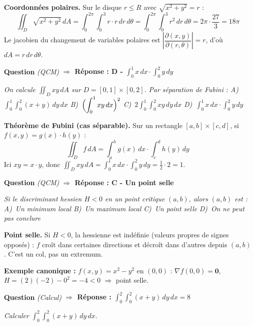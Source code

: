 \documentclass[11pt,a4paper]{article}
\newcounter{qnum}
\newcommand{\qtitre}[2]{%
  \stepcounter{qnum}%
  \medskip\noindent
  \textbf{\color{bleutexte}Question \theqnum}\enspace
  \textit{(#1)}\enspace
  \textcolor{vertok}{\textbf{$\Rightarrow$ Réponse : #2}}
  \par\smallskip
}
\newcommand{\qenonce}[1]{%
  \begin{mdframed}[backgroundcolor=grisbox, linewidth=0pt,
    innerleftmargin=8pt, innerrightmargin=8pt,
    innertopmargin=5pt, innerbottommargin=5pt,
    skipabove=2pt, skipbelow=4pt]
  \small\textit{#1}
  \end{mdframed}
}
\begin{document}
\begin{methodebox}
\textbf{Coordonnées polaires.} Sur le disque $r \leq R$ avec $\sqrt{x^2+y^2} = r$ :
$$\iint_D \sqrt{x^2+y^2}\,dA = \int_0^{2\pi}\!\int_0^3 r \cdot r\,dr\,d\theta = \int_0^{2\pi}\!\int_0^3 r^2\,dr\,d\theta = 2\pi\cdot\frac{27}{3} = 18\pi$$
Le jacobien du changement de variables polaires est $\left|\dfrac{\partial(x,y)}{\partial(r,\theta)}\right| = r$, d'où $dA = r\,dr\,d\theta$.
\end{methodebox}

\qtitre{QCM}{D - $\displaystyle\int_0^1 x\,dx \cdot \int_0^2 y\,dy$}
\qenonce{On calcule $\displaystyle\iint_D xy\,dA$ sur $D=[0,1]\times[0,2]$. Par séparation de Fubini :
\quad A)~$\displaystyle\int_0^1\!\int_0^2 (x+y)\,dy\,dx$
\quad B)~$\displaystyle\Bigl(\int_0^1 xy\,dx\Bigr)^2$
\quad C)~$\displaystyle 2\int_0^1\!\int_0^2 xy\,dy\,dx$
\quad D)~$\displaystyle\int_0^1 x\,dx \cdot \int_0^2 y\,dy$}

\begin{methodebox}
\textbf{Théorème de Fubini (cas séparable).} Sur un rectangle $[a,b]\times[c,d]$, si $f(x,y) = g(x)\cdot h(y)$ :
$$\iint_D f\,dA = \int_a^b g(x)\,dx \cdot \int_c^d h(y)\,dy$$
Ici $xy = x \cdot y$, donc $\displaystyle\iint_D xy\,dA = \int_0^1 x\,dx \cdot \int_0^2 y\,dy = \frac{1}{2}\cdot 2 = 1$.
\end{methodebox}

\qtitre{QCM}{C - Un point selle}
\qenonce{Si le discriminant hessien $H < 0$ en un point critique $(a,b)$, alors $(a,b)$ est :
\quad A)~Un minimum local
\quad B)~Un maximum local
\quad C)~Un point selle
\quad D)~On ne peut pas conclure}

\begin{methodebox}
\textbf{Point selle.} Si $H < 0$, la hessienne est indéfinie (valeurs propres de signes opposés) : $f$ croît dans certaines directions et décroît dans d'autres depuis $(a,b)$. C'est un col, pas un extremum.
\end{methodebox}

\textbf{Exemple canonique :} $f(x,y) = x^2 - y^2$ en $(0,0)$ : $\nabla f(0,0) = \mathbf{0}$, $H = (2)(−2) - 0^2 = -4 < 0$ $\Rightarrow$ point selle.

\qtitre{Calcul}{$\displaystyle\int_0^2\!\int_0^2 (x+y)\,dy\,dx = 8$}
\qenonce{Calculer $\displaystyle\int_0^2\!\int_0^2 (x+y)\,dy\,dx$.}
\end{document}

